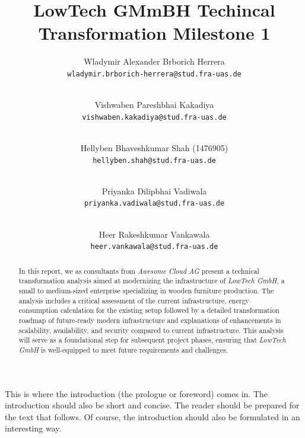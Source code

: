 \documentclass{llncs}
\newcommand{\what}{LowTech GMmBH Techincal Transformation Milestone 1}
\begin{document}
%
%
%
\mainmatter              %
%
\title{\what}
%
\author{
  Wladymir Alexander Brborich Herrera\\
  \texttt{wladymir.brborich-herrera@stud.fra-uas.de}
  \and\\ 
  Vishwaben Pareshbhai Kakadiya\\
  \texttt{vishwaben.kakadiya@stud.fra-uas.de}
  \and\\
  Hellyben Bhaveshkumar Shah (1476905)\\
  \texttt{hellyben.shah@stud.fra-uas.de}
  \and\\
  Priyanka Dilipbhai Vadiwala\\
  \texttt{priyanka.vadiwala@stud.fra-uas.de}
  \and\\
  Heer Rakeshkumar Vankawala\\
  \texttt{heer.vankawala@stud.fra-uas.de}
}
%

\maketitle              %

\begin{abstract}
In this report, we as consultants from \textit{Awesome Cloud AG} present a technical transformation analysis aimed at modernizing the infrastructure of \textit{LowTech GmbH}, 
a small to medium-sized enterprise specializing in wooden furniture production. 
The analysis includes a critical assessment of the current infrastructure, energy consumption calculation for the existing setup 
followed by a detailed transformation roadmap of future-ready modern infrastructure and explanations of enhancements in scalability, availability, and security compared to current infrastructure. 
This analysis will serve as a foundational step for subsequent project phases, ensuring that \textit{LowTech GmbH} is well-equipped to meet future requirements and challenges.
\end{abstract}

This is where the introduction (the prologue or foreword) comes in. The introduction should also be short and concise. The reader should be prepared for the text that follows. Of course, the introduction should also be formulated in an interesting way.
\end{document}
